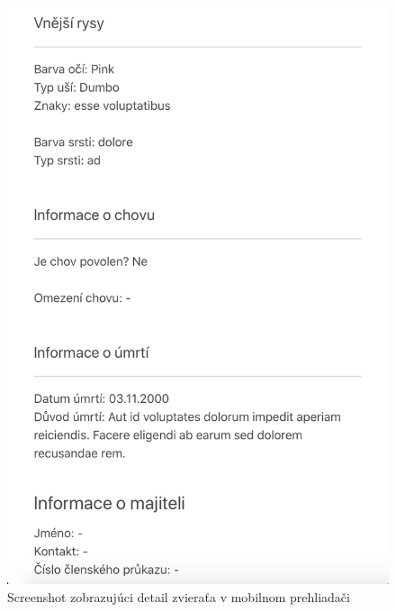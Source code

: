 \begin{figure}[H]
	\includegraphics[width=1.0\textwidth]{media/priloha/mobil/5.png}
	\caption{Screenshot zobrazujúci detail zvieraťa v mobilnom prehliadači}
\end{figure}

